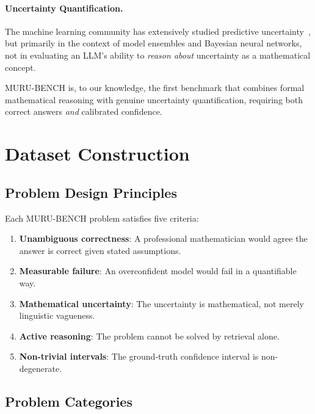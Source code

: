 \documentclass{article}
\begin{document}
\paragraph{Uncertainty Quantification.}
The machine learning community has extensively studied predictive uncertainty~\citep{gal2016, lakshminarayanan2017}, but primarily in the context of model ensembles and Bayesian neural networks, not in evaluating an LLM's ability to \emph{reason about} uncertainty as a mathematical concept.

MURU-BENCH is, to our knowledge, the first benchmark that combines formal mathematical reasoning with genuine uncertainty quantification, requiring both correct answers \emph{and} calibrated confidence.


\section{Dataset Construction}
\label{sec:dataset}

\subsection{Problem Design Principles}

Each MURU-BENCH problem satisfies five criteria:
\begin{enumerate}
    \item \textbf{Unambiguous correctness}: A professional mathematician would agree the answer is correct given stated assumptions.
    \item \textbf{Measurable failure}: An overconfident model would fail in a quantifiable way.
    \item \textbf{Mathematical uncertainty}: The uncertainty is mathematical, not merely linguistic vagueness.
    \item \textbf{Active reasoning}: The problem cannot be solved by retrieval alone.
    \item \textbf{Non-trivial intervals}: The ground-truth confidence interval is non-degenerate.
\end{enumerate}

\subsection{Problem Categories}
\end{document}
